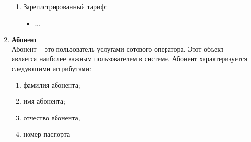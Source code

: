 \begin{enumerate}
\begin{enumerate}
        \item Зарегистрированный тариф:
        \begin{itemize}
            \item ...
        \end{itemize}
    \end{enumerate}

    \item \textbf{Абонент} \\
    Абонент -- это пользователь услугами сотового оператора. Этот объект является наиболее важным пользователем в системе. Абонент характеризуется следующими аттрибутами:
    \begin{enumerate}
        \item фамилия абонента;
        \item имя абонента;
        \item отчество абонента;
        \item номер паспорта
    \end{enumerate}
\end{enumerate}